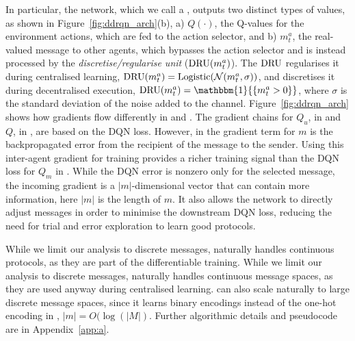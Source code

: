 In particular, the network, which we call a \dicnet, outputs two distinct types of values, as shown in Figure~\ref{fig:ddrqn_arch}(b), a) $Q(\cdot)$, the Q-values for the environment actions, which are fed to the action selector, and b) $m^a_t$, the real-valued message to other agents, which bypasses the action selector and is instead processed by the \emph{discretise/regularise unit} ($\text{DRU}(m^a_t)$). The $\text{DRU}$ regularises it during centralised learning, $\text{DRU}(m^{a}_{t})=\text{Logistic}(\mathcal{N}(m^a_t, \sigma))$,  and discretises it during decentralised execution, $\text{\magicbox}(m^{a}_{t}) = \mathbbm{1}{\{  {m}^{a}_{t} > 0 \}}$, where $\sigma$ is the standard deviation of the noise added to the channel. Figure~\ref{fig:ddrqn_arch} shows how gradients flow differently in \rec and \dic. The gradient chains for $Q_u$, in \rec  and $Q$, in \dic, are based on the DQN loss. However, in \dic the gradient term for $m$ is the backpropagated error from the recipient of the message to the sender.  Using this inter-agent gradient for training provides a richer training signal than the DQN loss for $Q_m$ in \rec. While the DQN error is nonzero only for the selected message, the incoming gradient is a $|m|$-dimensional vector that can contain more information, here $|m|$ is the length of $m$. It also allows the network to directly adjust messages in order to minimise the downstream DQN loss, reducing the need for trial and error exploration to learn good protocols. 

While we limit our analysis to discrete messages, \dic naturally handles continuous protocols, as they are part of the differentiable training. While we limit our analysis to discrete messages,  \dic naturally handles continuous message spaces, as they are used anyway during centralised learning. \dic can also scale naturally to large discrete message spaces, since it learns binary encodings instead of the one-hot encoding in \rec,  $|m| =O( \log(|M|)$.
Further algorithmic details and pseudocode are in Appendix~\ref{app:a}.
